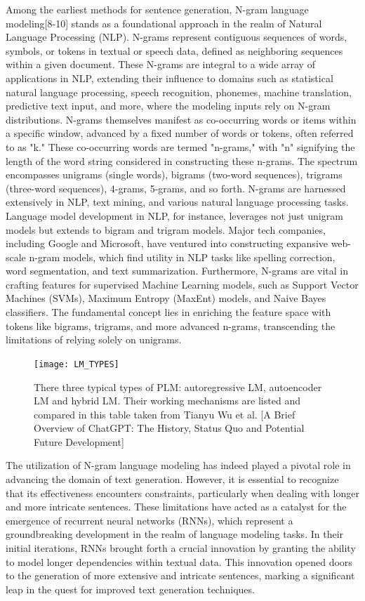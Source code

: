 \documentclass[conference]{IEEEtran}
\begin{document}
Among the earliest methods for sentence generation, N-gram language modeling[8-10] stands as a foundational approach in the realm of Natural Language Processing (NLP). N-grams represent contiguous sequences of words, symbols, or tokens in textual or speech data, defined as neighboring sequences within a given document. These N-grams are integral to a wide array of applications in NLP, extending their influence to domains such as statistical natural language processing, speech recognition, phonemes, machine translation, predictive text input, and more, where the modeling inputs rely on N-gram distributions. N-grams themselves manifest as co-occurring words or items within a specific window, advanced by a fixed number of words or tokens, often referred to as "k." These co-occurring words are termed "n-grams," with "n" signifying the length of the word string considered in constructing these n-grams. The spectrum encompasses unigrams (single words), bigrams (two-word sequences), trigrams (three-word sequences), 4-grams, 5-grams, and so forth. N-grams are harnessed extensively in NLP, text mining, and various natural language processing tasks. Language model development in NLP, for instance, leverages not just unigram models but extends to bigram and trigram models. Major tech companies, including Google and Microsoft, have ventured into constructing expansive web-scale n-gram models, which find utility in NLP tasks like spelling correction, word segmentation, and text summarization. Furthermore, N-grams are vital in crafting features for supervised Machine Learning models, such as Support Vector Machines (SVMs), Maximum Entropy (MaxEnt) models, and Naive Bayes classifiers. The fundamental concept lies in enriching the feature space with tokens like bigrams, trigrams, and more advanced n-grams, transcending the limitations of relying solely on unigrams.


\begin{figure}
    \centering
    \texttt{[image: LM\_TYPES]}
    \caption{There three typical types of PLM: autoregressive LM, autoencoder LM and hybrid LM. Their working mechanisms are listed and compared in this
table taken from Tianyu Wu et al. [A Brief Overview of ChatGPT: The History, Status Quo and Potential Future Development]}
    \label{fig:your_image_label}
\end{figure}


The utilization of N-gram language modeling has indeed played a pivotal role in advancing the domain of text generation. However, it is essential to recognize that its effectiveness encounters constraints, particularly when dealing with longer and more intricate sentences. These limitations have acted as a catalyst for the emergence of recurrent neural networks (RNNs), which represent a groundbreaking development in the realm of language modeling tasks. In their initial iterations, RNNs brought forth a crucial innovation by granting the ability to model longer dependencies within textual data. This innovation opened doors to the generation of more extensive and intricate sentences, marking a significant leap in the quest for improved text generation techniques.
\end{document}
